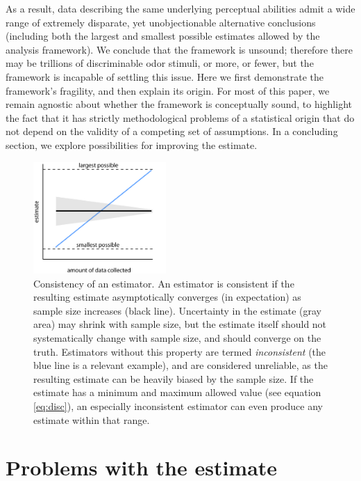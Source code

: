 \documentclass[letterpaper,twocolumn,10pt]{article}
\begin{document}
As a result, data describing the same underlying perceptual abilities admit a wide range of extremely disparate, 
yet unobjectionable alternative conclusions (including both the largest and smallest possible estimates allowed by the analysis framework). 
We conclude that the framework is unsound; 
therefore there may be trillions of discriminable odor stimuli, or more, or fewer, 
but the framework is incapable of settling this issue.  
Here we first demonstrate the framework's fragility, and then explain its origin. 
For most of this paper, we remain agnostic about whether the framework is conceptually sound, 
to highlight the fact that it has strictly methodological problems of a statistical origin that do not depend on the validity of a competing set of assumptions.
In a concluding section, we explore possibilities for improving the estimate. 

\begin{figure}[hbt]
    \includegraphics[width=0.45\textwidth]{figures/Fig1_StatPathology}
    \caption{
Consistency of an estimator. 
An estimator is consistent if the resulting estimate asymptotically converges (in expectation) 
as sample size increases (black line). 
Uncertainty in the estimate (gray area) may shrink with sample size, 
but the estimate itself should not systematically change with sample size, and should converge on the truth. 
Estimators without this property are termed \textit{inconsistent} (the blue line is a relevant example), and are considered unreliable, as the resulting estimate can be heavily biased by the sample size.  If the estimate has a minimum and maximum allowed value (see equation \ref{eq:disc}), an especially inconsistent estimator can even produce any estimate within that range.  
}
    \label{fig:statpathology}
\end{figure}

\section{Problems with the estimate}
\label{sec:demonstration}
\end{document}
